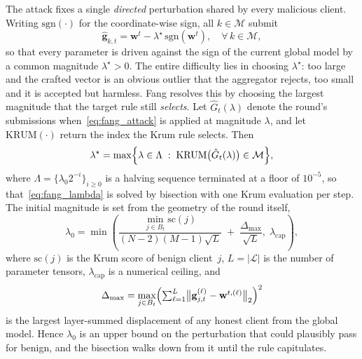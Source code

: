 \documentclass[journal]{IEEEtran}
\begin{document}
The attack fixes a single \emph{directed} perturbation shared by every malicious client. Writing $\mathrm{sgn}(\cdot)$ for the coordinate-wise sign, all $k \in \mathcal{M}$ submit
\begin{equation}
\hat{\mathbf{g}}_{k,t} = \mathbf{w}^t - \lambda^\star \,\mathrm{sgn}\!\left(\mathbf{w}^t\right), \quad \forall\, k \in \mathcal{M},
\label{eq:fang_attack}
\end{equation}
so that every parameter is driven against the sign of the current global model by a common magnitude $\lambda^\star > 0$. The entire difficulty lies in choosing $\lambda^\star$: too large and the crafted vector is an obvious outlier that the aggregator rejects, too small and it is accepted but harmless. Fang resolves this by choosing the largest magnitude that the target rule still \emph{selects}. Let $\hat G_t(\lambda)$ denote the round's submissions when~\eqref{eq:fang_attack} is applied at magnitude $\lambda$, and let $\mathrm{KRUM}(\cdot)$ return the index the Krum rule selects. Then
\begin{equation}
\lambda^\star = \max\Bigl\{\lambda \in \Lambda \;:\; \mathrm{KRUM}\bigl(\hat G_t(\lambda)\bigr) \in \mathcal{M} \Bigr\},
\label{eq:fang_lambda}
\end{equation}
where $\Lambda = \{\lambda_0 2^{-i}\}_{i \ge 0}$ is a halving sequence terminated at a floor of $10^{-5}$, so that~\eqref{eq:fang_lambda} is solved by bisection with one Krum evaluation per step. The initial magnitude is set from the geometry of the round itself,
\begin{equation}
\lambda_0 = \min\left( \frac{\min_{j \in B_t} \mathrm{sc}(j)}{(N-2)(M-1)\sqrt{L}} \;+\; \frac{\Delta_{\max}}{\sqrt{L}},\; \lambda_{\mathrm{cap}} \right),
\label{eq:fang_lambda0}
\end{equation}
where $\mathrm{sc}(j)$ is the Krum score of benign client~$j$, $L = |\mathcal{L}|$ is the number of parameter tensors, $\lambda_{\mathrm{cap}}$ is a numerical ceiling, and
\begin{equation}
\Delta_{\max} = \max_{j \in B_t} \Bigl( \textstyle\sum_{\ell=1}^{L} \bigl\| \mathbf{g}_{j,t}^{(\ell)} - \mathbf{w}^{t,(\ell)} \bigr\|_2 \Bigr)^{2}
\label{eq:fang_dmax}
\end{equation}
is the largest layer-summed displacement of any honest client from the global model. Hence $\lambda_0$ is an upper bound on the perturbation that could plausibly pass for benign, and the bisection walks down from it until the rule capitulates.
\end{document}
